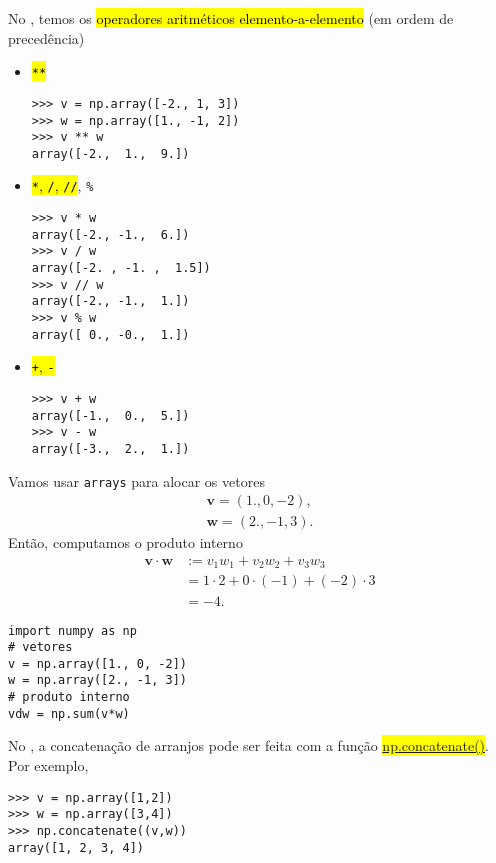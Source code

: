 No {\numpy}, temos os \hl{operadores aritméticos elemento-a-elemento} (em ordem de precedência)
\begin{itemize}
\item \hl{{\lstinline!**!}}
\begin{lstlisting}
>>> v = np.array([-2., 1, 3])
>>> w = np.array([1., -1, 2])
>>> v ** w
array([-2.,  1.,  9.])
\end{lstlisting}
\item \hl{{\lstinline!*!}, {\lstinline!/!}, {\lstinline!//!}}, \lstinline!%!
\begin{lstlisting}
>>> v * w
array([-2., -1.,  6.])
>>> v / w
array([-2. , -1. ,  1.5])
>>> v // w
array([-2., -1.,  1.])
>>> v % w
array([ 0., -0.,  1.])
\end{lstlisting}
\item \hl{{\lstinline!+!}, {\lstinline!-!}}
\begin{lstlisting}
>>> v + w
array([-1.,  0.,  5.])
>>> v - w
array([-3.,  2.,  1.])
\end{lstlisting}
\end{itemize}

\begin{ex}
  Vamos usar \lstinline+arrays+ para alocar os vetores
  \begin{align}
    \pmb{v} = (1., 0, -2),\\
    \pmb{w} = (2., -1, 3).
  \end{align}
  Então, computamos o produto interno
  \begin{subequations}
    \begin{align}
      \pmb{v}\cdot\pmb{w} &:= v_1w_1 + v_2w_2 + v_3w_3\\
                          &= 1\cdot 2 + 0\cdot(-1) + (-2)\cdot 3\\
                          &= -4.
    \end{align}
  \end{subequations}
\begin{lstlisting}
import numpy as np
# vetores
v = np.array([1., 0, -2])
w = np.array([2., -1, 3])
# produto interno
vdw = np.sum(v*w)
\end{lstlisting}
\end{ex}

\begin{obs}
  No {\numpy}, a concatenação de arranjos pode ser feita com a função \hl{{\href{https://numpy.org/doc/stable/reference/generated/numpy.concatenate.html}{np.concatenate()}}}. Por exemplo,
\begin{lstlisting}
>>> v = np.array([1,2])
>>> w = np.array([3,4])
>>> np.concatenate((v,w))
array([1, 2, 3, 4])
\end{lstlisting}
\end{obs}

